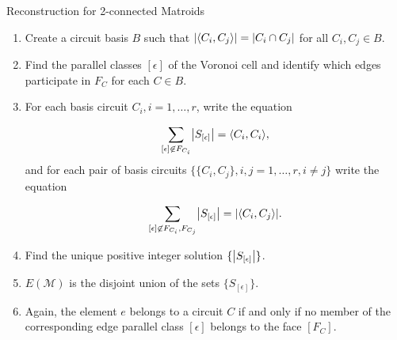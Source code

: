 \documentclass[9pt]{beamer}
\def\calM{\mathcal M}
\DeclarePairedDelimiter\abs{\lvert}{\rvert}
\DeclarePairedDelimiter\iprod{\langle}{\rangle}
\begin{document}
    \begin{frame}{Reconstruction for 2-connected Matroids}
        
        \begin{enumerate}
            \item Create a circuit basis $B$ such that $\abs*{\iprod*{C_i, C_j}}=\abs*{C_i\cap C_j}$ for all $C_i, C_j\in B$.\pause
            \item Find the parallel classes $[\epsilon]$ of the Voronoi cell and identify which edges participate in $F_C$ for each $C\in B$.\pause
            \item For each basis circuit $C_i, i=1, \dots, r$, write the equation

            \[\sum_{[\epsilon]\not\in F_{C_i}} \abs*{S_{[\epsilon]}}=\iprod*{C_i, C_i},\]
            and for each pair of basis circuits $\{\{C_i, C_j\}, i, j=1, \dots, r, i\neq j\}$ write the equation
            
            \[\sum_{[\epsilon]\not\in F_{C_i}, F_{C_j}} \abs*{S_{[\epsilon]}}=\abs*{\iprod*{C_i, C_j}}.\]\pause
            \item Find the unique positive integer solution $\{\abs*{S_{[\epsilon]}}\}$.\pause
            \item $E(\calM)$ is the disjoint union of the sets $\{S_{[\epsilon]}\}$.\pause
            \item Again, the element $e$ belongs to a circuit $C$ if and only if no member of the corresponding edge parallel class $[\epsilon]$ belongs to the face $[F_C]$.
        \end{enumerate}
        
    \end{frame}
\end{document}

